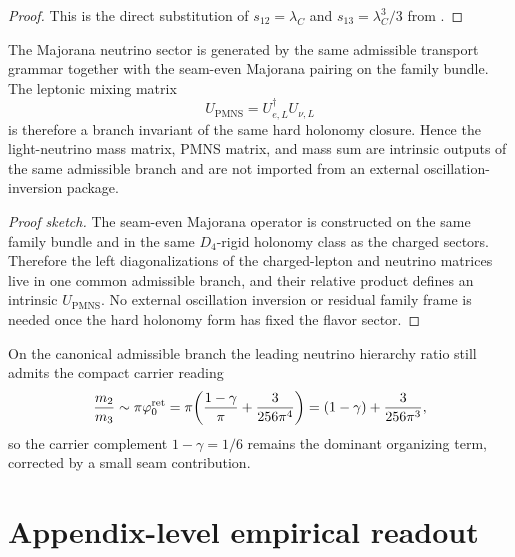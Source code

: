 \begin{proof}
This is the direct substitution of $s_{12}=\lambda_C$ and
$s_{13}=\lambda_C^3/3$ from .
\end{proof}

\begin{theorem}
\label{thm:neutrino-closure}
The Majorana neutrino sector is generated by the same admissible transport grammar together
with the seam-even Majorana pairing on the family bundle. The leptonic mixing matrix
\[
U_{\mathrm{PMNS}}=U_{e,L}^\dagger U_{\nu,L}
\]
is therefore a branch invariant of the same hard holonomy closure. Hence the light-neutrino mass
matrix, PMNS matrix, and mass sum are intrinsic outputs of the same admissible branch and are not
imported from an external oscillation-inversion package.
\end{theorem}

\begin{proof}[Proof sketch]
The seam-even Majorana operator is constructed on the same family bundle and in the same
$D_4$-rigid holonomy class as the charged sectors. Therefore the left diagonalizations of the
charged-lepton and neutrino matrices live in one common admissible branch, and their relative
product defines an intrinsic $U_{\mathrm{PMNS}}$. No external oscillation inversion or residual
family frame is needed once the hard holonomy form has fixed the flavor sector.
\end{proof}

\begin{remark}
On the canonical admissible branch the leading neutrino hierarchy ratio still admits the
compact carrier reading
\[
\frac{m_2}{m_3}\sim \pi\varphi_0^{\mathrm{ret}}
=
\pi\!\left(\frac{1-\gamma}{\pi}+\frac{3}{256\pi^4}\right)
=
(1-\gamma)+\frac{3}{256\pi^3},
\]
so the carrier complement $1-\gamma=1/6$ remains the dominant organizing term, corrected by a
small seam contribution.
\end{remark}


\section{Appendix-level empirical readout}
\label{sec:appendix-empirical-readout}
\label{app:comparison}


